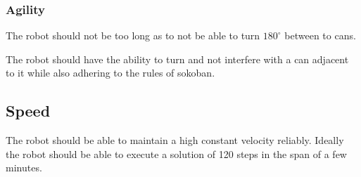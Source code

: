 \documentclass[../../main.tex]{subfiles}
\begin{document}
\subsubsection{Agility}%
\label{ssub:agility}

The robot should not be too long as to not be able to turn $180^{\circ}$ between to cans.

The robot should have the ability to turn and not interfere with a can adjacent to it while also adhering to the rules of sokoban. 

\subsection{Speed}%
\label{sub:speed}

The robot should be able to maintain a high constant velocity reliably. Ideally the robot should be able to execute a solution of 120 steps in the span of a few minutes.



	
\end{document}
